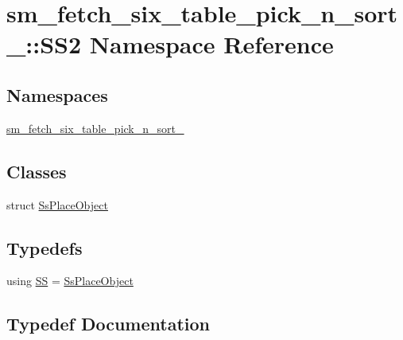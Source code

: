 \hypertarget{namespacesm__fetch__six__table__pick__n__sort__1_1_1SS2}{}\section{sm\+\_\+fetch\+\_\+six\+\_\+table\+\_\+pick\+\_\+n\+\_\+sort\+\_\+:\+:S\+S2 Namespace Reference}
\label{namespacesm__fetch__six__table__pick__n__sort__1_1_1SS2}
\subsection*{Namespaces}
\begin{DoxyCompactItemize}
\item 
 \hyperlink{namespacesm__fetch__six__table__pick__n__sort__1_1_1SS2_1_1sm__fetch__six__table__pick__n__sort__1}{sm\+\_\+fetch\+\_\+six\+\_\+table\+\_\+pick\+\_\+n\+\_\+sort\+\_}
\end{DoxyCompactItemize}
\subsection*{Classes}
\begin{DoxyCompactItemize}
\item 
struct \hyperlink{structsm__fetch__six__table__pick__n__sort__1_1_1SS2_1_1SsPlaceObject}{Ss\+Place\+Object}
\end{DoxyCompactItemize}
\subsection*{Typedefs}
\begin{DoxyCompactItemize}
\item 
using \hyperlink{namespacesm__fetch__six__table__pick__n__sort__1_1_1SS2_a4f1a58af7957ca6aa36b45310bbf07ab}{SS} = \hyperlink{structsm__fetch__six__table__pick__n__sort__1_1_1SS2_1_1SsPlaceObject}{Ss\+Place\+Object}
\end{DoxyCompactItemize}


\subsection{Typedef Documentation}
\mbox{\label{namespacesm__fetch__six__table__pick__n__sort__1_1_1SS2_a4f1a58af7957ca6aa36b45310bbf07ab}} 
